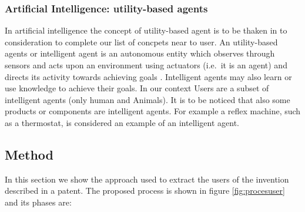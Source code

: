 \documentclass[b5paper,]{book}
\theoremstyle{definition}
\theoremstyle{definition}
\theoremstyle{definition}
\theoremstyle{remark}
\begin{document}
\subsubsection*{Artificial Intelligence: utility-based
agents}\label{artificial-intelligence-utility-based-agents}

In artificial intelligence the concept of utility-based agent is to be
thaken in to consideration to complete our list of concpets near to
user. An utility-based agents or intelligent agent is an autonomous
entity which observes through sensors and acts upon an environment using
actuators (i.e.~it is an agent) and directs its activity towards
achieving goals \citep{russell2016artificial}. Intelligent agents may
also learn or use knowledge to achieve their goals. In our context Users
are a subset of intelligent agents (only human and Animals). It is to be
noticed that also some products or components are intelligent agents.
For example a reflex machine, such as a thermostat, is considered an
example of an intelligent agent.

\subsection{Method}\label{method}

In this section we show the approach used to extract the users of the
invention described in a patent. The proposed process is shown in figure
\ref{fig:procesuser} and its phases are:
\end{document}
